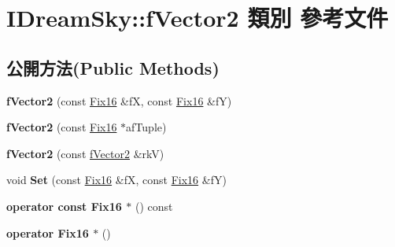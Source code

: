 \hypertarget{class_i_dream_sky_1_1f_vector2}{}\section{I\+Dream\+Sky\+:\+:f\+Vector2 類別 參考文件}
\label{class_i_dream_sky_1_1f_vector2}
\subsection*{公開方法(Public Methods)}
\begin{DoxyCompactItemize}
\item 
{\bfseries f\+Vector2} (const \hyperlink{class_i_dream_sky_1_1_fix_point}{Fix16} \&fX, const \hyperlink{class_i_dream_sky_1_1_fix_point}{Fix16} \&fY)\hypertarget{class_i_dream_sky_1_1f_vector2_ad01da39022b9a45c70d08583f4d61074}{}\label{class_i_dream_sky_1_1f_vector2_ad01da39022b9a45c70d08583f4d61074}

\item 
{\bfseries f\+Vector2} (const \hyperlink{class_i_dream_sky_1_1_fix_point}{Fix16} $\ast$af\+Tuple)\hypertarget{class_i_dream_sky_1_1f_vector2_a4f29da9cf8e64ac7b2ee1a2cc264eade}{}\label{class_i_dream_sky_1_1f_vector2_a4f29da9cf8e64ac7b2ee1a2cc264eade}

\item 
{\bfseries f\+Vector2} (const \hyperlink{class_i_dream_sky_1_1f_vector2}{f\+Vector2} \&rkV)\hypertarget{class_i_dream_sky_1_1f_vector2_aa474a06fb3d6dd42132915494be0c8cd}{}\label{class_i_dream_sky_1_1f_vector2_aa474a06fb3d6dd42132915494be0c8cd}

\item 
void {\bfseries Set} (const \hyperlink{class_i_dream_sky_1_1_fix_point}{Fix16} \&fX, const \hyperlink{class_i_dream_sky_1_1_fix_point}{Fix16} \&fY)\hypertarget{class_i_dream_sky_1_1f_vector2_a7f4b425fb7fb4c8c423c9fd9d90d6d2f}{}\label{class_i_dream_sky_1_1f_vector2_a7f4b425fb7fb4c8c423c9fd9d90d6d2f}

\item 
{\bfseries operator const Fix16 $\ast$} () const \hypertarget{class_i_dream_sky_1_1f_vector2_a6c712d8b2ec7448d9cd9b8a3b1eee1dc}{}\label{class_i_dream_sky_1_1f_vector2_a6c712d8b2ec7448d9cd9b8a3b1eee1dc}

\item 
{\bfseries operator Fix16 $\ast$} ()\hypertarget{class_i_dream_sky_1_1f_vector2_ad79fd4dfb1fb1f59f9f3c086f3194ce2}{}\label{class_i_dream_sky_1_1f_vector2_ad79fd4dfb1fb1f59f9f3c086f3194ce2}


\end{DoxyCompactItemize}
